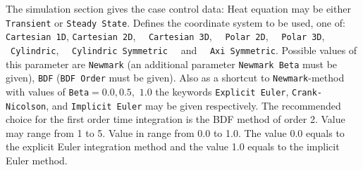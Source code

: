 The simulation section gives the case control data:
\sifbegin
{} Heat equation may be either 
{\tt Transient} or {\tt Steady State}.
 Defines the coordinate system to be used, one of:
{\tt Cartesian 1D}, {\tt Cartesian 2D},~ ~{\tt Cartesian 3D},~ ~{\tt Polar 2D},~ 
~{\tt Polar 3D},~ ~{\tt Cy\-lin\-dric},~ ~{\tt Cylindric Symmetric}~
~and~ ~{\tt Axi Symmetric}.
%
%
Possible values of this parameter are {\tt Newmark} (an additional
parameter {\tt Newmark Beta} must be given), {\tt BDF} ({\tt BDF Order} must be given). Also as a
shortcut to {\tt Newmark}-method with values of {\tt Beta}$=0.0, 0.5,$ $1.0$ the keywords 
{\tt Explicit Euler}, {\tt Crank-Nicolson}, and {\tt Implicit Euler} may be given respectively.
The recommended choice for the first order time integration is the BDF method of order 2.
Value may range from 1 to 5.
 Value in range from 0.0 to 1.0. The value 0.0 equals to
the explicit Euler integration method and the value 1.0 equals to the implicit Euler method. 
\sifend

